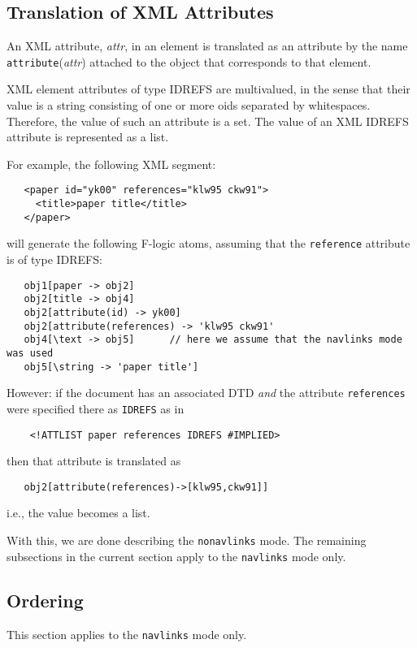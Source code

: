 \subsection{Translation of XML Attributes}

An XML attribute, \emph{attr},  in an element is translated as an attribute
by the name \texttt{attribute}(\emph{attr}) attached to the object that
corresponds to that element.  

XML element attributes of type IDREFS are multivalued, in the sense
that their value is a string consisting of one or more oids separated
by whitespaces. Therefore, the value of such an attribute is a set.
The value of an XML IDREFS
attribute is represented as a list.

For example, the following XML segment:
\begin{verbatim}
   <paper id="yk00" references="klw95 ckw91">
     <title>paper title</title>
   </paper>
\end{verbatim}
will generate the following F-logic atoms, assuming that the
{\tt reference}  attribute is of type IDREFS:
\begin{verbatim}
   obj1[paper -> obj2]
   obj2[title -> obj4]
   obj2[attribute(id) -> yk00]
   obj2[attribute(references) -> 'klw95 ckw91'
   obj4[\text -> obj5]      // here we assume that the navlinks mode was used
   obj5[\string -> 'paper title']
\end{verbatim}

However: if the document has an associated DTD \emph{and} the attribute
\texttt{references} were specified there as \texttt{IDREFS} as in
\begin{verbatim}
    <!ATTLIST paper references IDREFS #IMPLIED> 
\end{verbatim}
then that attribute is translated as
\begin{verbatim}
   obj2[attribute(references)->[klw95,ckw91]] 
\end{verbatim}
i.e., the value becomes a list.

With this, we are done describing the \texttt{nonavlinks} mode. The
remaining subsections in the current section apply to the
\texttt{navlinks} mode only.  


\subsection{Ordering}

This section applies to the \texttt{navlinks} mode only. 

